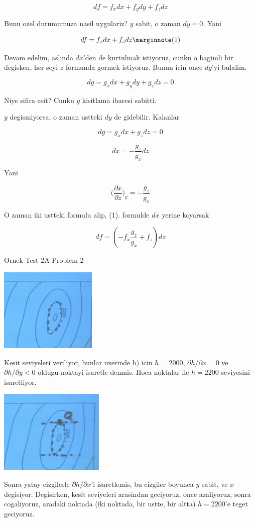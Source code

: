 \documentclass[12pt,fleqn]{article}\usepackage{../common}
\begin{document}
\[ df = f_xdx + f_ydy + f_zdz \]  

Bunu ozel durumumuza nasil uygulariz? $y$ sabit, o zaman $dy = 0$. Yani

\[
df = f_xdx + f_zdz  \mlabel{1}
\]

Devam edelim, aslinda $dx$'den de kurtulmak istiyoruz, cunku o bagimli bir
degisken, her seyi $z$ formunda gormek istiyoruz. Bunun icin once $dg$'yi
bulalim. 

\[ dg = g_xdx + g_ydy + g_zdz = 0   \]

Niye sifira esit? Cunku $g$ kisitlama ibaresi sabitti. 

$y$ degismiyorsa, o zaman ustteki $dy$ de gidebilir. Kalanlar

\[ dg = g_xdx + g_zdz = 0  \]

\[ dx = -\frac{g_z}{g_x}dz \]

Yani 

\[ 
\bigg( \frac{\partial x}{\partial z}\bigg)_{y} = -\frac{g_z}{g_x}
 \]

O zaman iki ustteki formulu alip, (1). formulde $dx$ yerine 
koyarsak

\[ df = (-f_x\frac{g_z}{g_x} +  f_z) dz \]

Ornek Test 2A Problem 2

\includegraphics[height=4cm]{15_2.png}

Kesit seviyeleri veriliyor, bunlar uzerinde b) icin $h$ = 2000, 
$\partial
h/\partial x = 0$ ve $\partial h/\partial y < 0$ oldugu noktayi isaretle denmis. Hoca 
noktalar ile $h=2200$ seviyesini isaretliyor. 

\includegraphics[height=4cm]{15_3.png}

Sonra yatay cizgilerle $\partial h/\partial x$'i isaretlemis, bu cizgiler
boyunca $y$ sabit, ve $x$ degisiyor. Degisirken, kesit seviyeleri arasindan
geciyoruz, once azaliyoruz, sonra cogaliyoruz, aradaki noktada (iki
noktada, bir ustte, bir altta) $h=2200$'e teget geciyoruz. 
\end{document}
